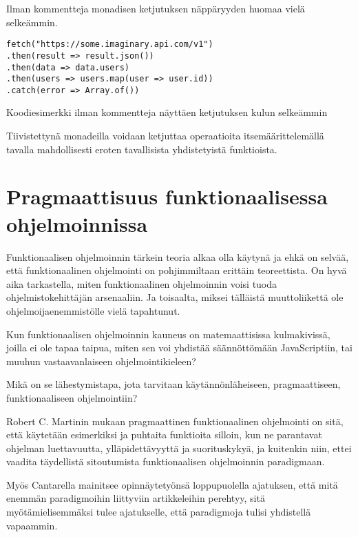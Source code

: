 Ilman kommentteja monadisen ketjutuksen näppäryyden huomaa vielä selkeämmin.

\begin{code}
    \begin{verbatim}
fetch("https://some.imaginary.api.com/v1") 
.then(result => result.json()) 
.then(data => data.users)
.then(users => users.map(user => user.id))
.catch(error => Array.of()) 
    \end{verbatim}
    \caption{Koodiesimerkki \cite{code:promise_monad_fr} ilman kommentteja näyttäen ketjutuksen kulun selkeämmin}
    \label{code:promise_monad_concise}
\end{code}


Tiivistettynä monadeilla voidaan ketjuttaa operaatioita itsemäärittelemällä tavalla mahdollisesti eroten tavallisista yhdistetyistä funktioista.


\section{Pragmaattisuus funktionaalisessa ohjelmoinnissa}

Funktionaalisen ohjelmoinnin tärkein teoria alkaa olla käytynä ja ehkä on selvää, että funktionaalinen ohjelmointi on pohjimmiltaan erittäin teoreettista. On hyvä aika tarkastella, miten funktionaalinen ohjelmoinnin voisi tuoda ohjelmistokehittäjän arsenaaliin. Ja toisaalta, miksei tälläistä muuttoliikettä ole ohjelmoijaenemmistölle vielä tapahtunut.

Kun funktionaalisen ohjelmoinnin kauneus on matemaattisissa kulmakivissä, joilla ei ole tapaa taipua, miten sen voi yhdistää säännöttömään JavaScriptiin, tai muuhun vastaavanlaiseen ohjelmointikieleen?

Mikä on se lähestymistapa, jota tarvitaan käytännönläheiseen, pragmaattiseen, funktionaaliseen ohjelmointiin?

Robert C. Martinin mukaan pragmaattinen funktionaalinen ohjelmointi on sitä, että käytetään esimerkiksi  ja puhtaita funktioita silloin, kun ne parantavat ohjelman luettavuutta, ylläpidettävyyttä ja suorituskykyä, ja kuitenkin niin, ettei vaadita täydellistä sitoutumista funktionaalisen ohjelmoinnin paradigmaan. \citep{martin2017pragmaticfp}

Myös Cantarella mainitsee opinnäytetyönsä loppupuolella ajatuksen, että mitä enemmän paradigmoihin liittyviin artikkeleihin perehtyy, sitä myötämielisemmäksi tulee ajatukselle, että paradigmoja tulisi yhdistellä vapaammin. \citep[45]{cantarella_fp_haitat}


